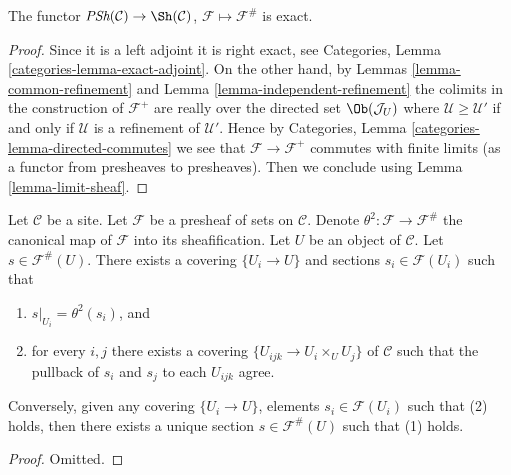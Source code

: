 \begin{lemma}
\label{lemma-sheafification-exact}
The functor $\textit{PSh}(\mathcal{C}) \to \Sh(\mathcal{C})$,
$\mathcal{F} \mapsto \mathcal{F}^\#$ is exact.
\end{lemma}

\begin{proof}
Since it is a left adjoint it is right exact, see
Categories, Lemma \ref{categories-lemma-exact-adjoint}.
On the other hand, by Lemmas \ref{lemma-common-refinement}
and Lemma \ref{lemma-independent-refinement} the colimits
in the construction of $\mathcal{F}^+$ are really over the
directed set $\Ob(\mathcal{J}_U)$ where
$\mathcal{U} \geq \mathcal{U}'$ if and only if
$\mathcal{U}$ is a refinement of $\mathcal{U}'$. Hence by
Categories, Lemma \ref{categories-lemma-directed-commutes}
we see that $\mathcal{F} \to \mathcal{F}^+$ commutes
with finite limits (as a functor from presheaves to
presheaves). Then we conclude using
Lemma \ref{lemma-limit-sheaf}.
\end{proof}

\begin{lemma}
\label{lemma-sections-sheafification}
Let $\mathcal{C}$ be a site.
Let $\mathcal{F}$ be a presheaf of sets on $\mathcal{C}$.
Denote $\theta^2 : \mathcal{F} \to \mathcal{F}^\#$ the canonical
map of $\mathcal{F}$ into its sheafification.
Let $U$ be an object of $\mathcal{C}$.
Let $s \in \mathcal{F}^\#(U)$. There exists
a covering $\{U_i \to U\}$ and sections
$s_i \in \mathcal{F}(U_i)$ such that
\begin{enumerate}
\item $s|_{U_i} = \theta^2(s_i)$, and
\item for every $i, j$ there exists a covering
$\{U_{ijk} \to U_i \times_U U_j\}$ of $\mathcal{C}$ such that
the pullback of $s_i$ and $s_j$ to each $U_{ijk}$ agree.
\end{enumerate}
Conversely, given any covering $\{U_i \to U\}$, elements
$s_i \in \mathcal{F}(U_i)$ such that (2) holds, then there
exists a unique section $s \in \mathcal{F}^\#(U)$ such
that (1) holds.
\end{lemma}

\begin{proof}
Omitted.
\end{proof}













